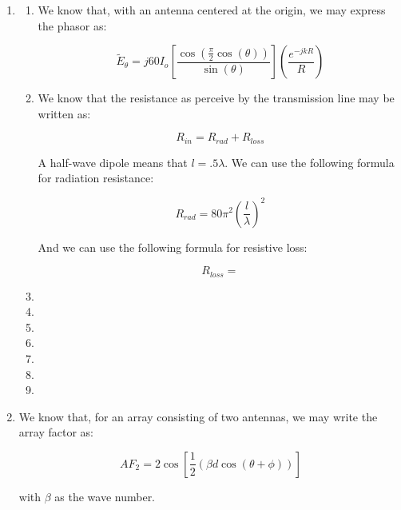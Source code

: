 \begin{enumerate}

  \item 

    \begin{enumerate}

      \item 

        We know that, with an antenna centered at the origin, we may express the phasor as:

        $$\tilde{E}_\theta=j60I_o\left[ \frac{\cos\left( \frac{\pi}{2}\cos(\theta) \right)}{\sin(\theta)} \right]\left(\frac{e^{-jkR}}{R}\right)$$

      \item 

        We know that the resistance as perceive by the transmission line may be written as:

        $$R_{in}=R_{rad}+R_{loss}$$

        A half-wave dipole means that $l=.5\lambda$. We can use the following formula for radiation resistance:

        $$R_{rad}=80\pi^2\left( \frac{l}{\lambda} \right)^2$$

        And we can use the following formula for resistive loss:

        $$R_{loss}=$$

      \item 

      \item 

      \item 

      \item 

      \item 

      \item 

      \item 

    \end{enumerate}

  \item 

        We know that, for an array consisting of two antennas, we may write the array factor as:

        $$AF_2=2\cos\left[ \frac{1}{2}\left( \beta d\cos(\theta+\phi) \right) \right]$$

        with $\beta$ as the wave number.
        


\end{enumerate}

